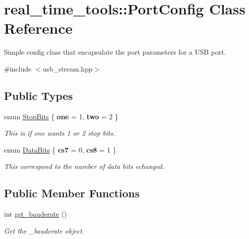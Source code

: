 \hypertarget{classreal__time__tools_1_1PortConfig}{}\section{real\+\_\+time\+\_\+tools\+:\+:Port\+Config Class Reference}
\label{classreal__time__tools_1_1PortConfig}


Simple config class that encapsulate the port parameters for a U\+SB port.  




{\ttfamily \#include $<$usb\+\_\+stream.\+hpp$>$}

\subsection*{Public Types}
\begin{DoxyCompactItemize}
\item 
\mbox{\label{classreal__time__tools_1_1PortConfig_a62bbab15705e2d5a9bc17115222f7c07}} 
enum \hyperlink{classreal__time__tools_1_1PortConfig_a62bbab15705e2d5a9bc17115222f7c07}{Stop\+Bits} \{ {\bfseries one} = 1, 
{\bfseries two} = 2
 \}\begin{DoxyCompactList}\small\item\em This is if one wants 1 or 2 stop bits. \end{DoxyCompactList}
\item 
\mbox{\label{classreal__time__tools_1_1PortConfig_a11e818aa26cd0a941ff00b9ccd4d2131}} 
enum \hyperlink{classreal__time__tools_1_1PortConfig_a11e818aa26cd0a941ff00b9ccd4d2131}{Data\+Bits} \{ {\bfseries cs7} = 0, 
{\bfseries cs8} = 1
 \}\begin{DoxyCompactList}\small\item\em This correspond to the number of data bits echanged. \end{DoxyCompactList}
\end{DoxyCompactItemize}
\subsection*{Public Member Functions}
\begin{DoxyCompactItemize}
\item 
int \hyperlink{classreal__time__tools_1_1PortConfig_a9dc2941d278825ecc20a5f260a7fb076}{get\+\_\+bauderate} ()
\begin{DoxyCompactList}\small\item\em Get the \+\_\+bauderate object. \end{DoxyCompactList}\end{DoxyCompactItemize}
